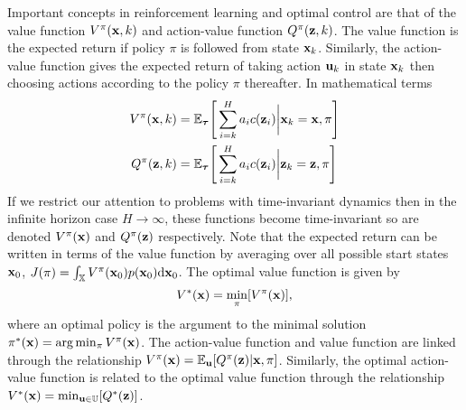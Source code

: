 %
Important concepts in reinforcement learning and optimal control are that of the value function $V^\pi(\mathbf{x},k)$ and action-value function $Q^\pi(\mathbf{z},k)$. The value function is the expected return if policy $\pi$ is followed from state $\mathbf{x}_k$. Similarly, the action-value function gives the expected return of taking action $\mathbf{u}_k$ in state $\mathbf{x}_k$ then choosing actions according to the policy $\pi$ thereafter. In mathematical terms 
\begin{align*}
V^\pi(\mathbf{x},k) &= \mathbb{E}_{\boldsymbol{\tau}}\Bigg[ \sum^H_{i=k} a_ic(\mathbf{z}_i) \bigg|\mathbf{x}_k=\mathbf{x},\pi \Bigg] \\
Q^\pi(\mathbf{z},k) &= \mathbb{E}_{\boldsymbol{\tau}}\Bigg[ \sum^H_{i=k} a_ic(\mathbf{z}_i) \bigg|\mathbf{z}_k=\mathbf{z},\pi \Bigg]
\end{align*}
If we restrict our attention to problems with time-invariant dynamics then in the infinite horizon case $H\rightarrow\infty$, these functions become time-invariant so are denoted $V^\pi(\mathbf{x})$ and $Q^\pi(\mathbf{z})$ respectively. Note that the expected return can be written in terms of the value function by averaging over all possible start states $\mathbf{x}_0$, $J(\pi) = \int_{\mathbb{X}} V^\pi(\mathbf{x}_0)p(\mathbf{x}_0)\mathrm{d}\mathbf{x}_0$.
The optimal value function is given by
\begin{equation*}
V^*(\mathbf{x}) = \min_{\pi} [V^\pi(\mathbf{x})],
\end{equation*}
where an optimal policy is the argument to the minimal solution $\pi^*(\mathbf{x}) = \arg\min_{\pi} V^\pi(\mathbf{x})$. The action-value function and value function are linked through the relationship $V^\pi(\mathbf{x}) = \mathbb{E}_{\mathbf{u}} [Q^\pi(\mathbf{z})|\mathbf{x},\pi]$. Similarly, the optimal action-value function is related to the optimal value function through the relationship $V^*(\mathbf{x}) = \min_{\mathbf{u} \in \mathbb{U}} [Q^*(\mathbf{z})]$.




